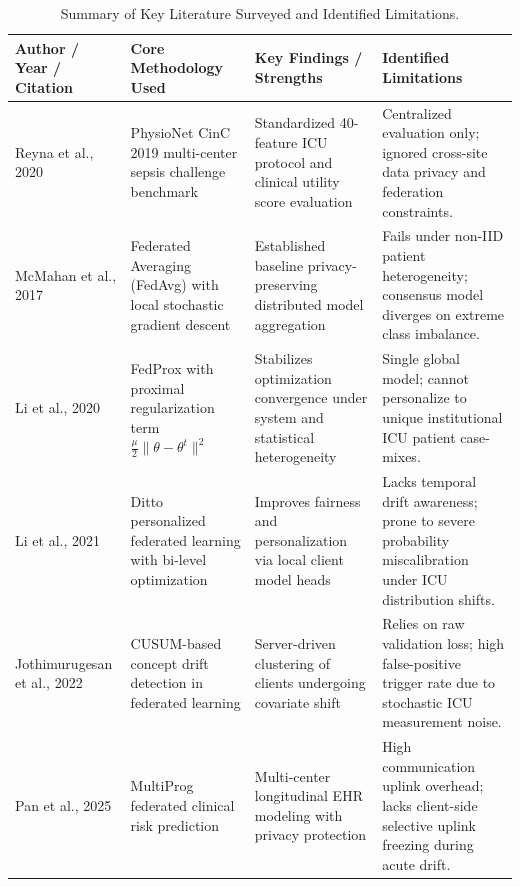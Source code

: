 \documentclass[11pt, a4paper]{article}
\begin{document}
\begin{table}[!htbp]
    \centering
    \footnotesize
    \renewcommand{\arraystretch}{1.12}
    \begin{tabular}{p{3.2cm} p{4.0cm} p{4.3cm} p{3.5cm}}
        \toprule
        \textbf{Author / Year / Citation} & \textbf{Core Methodology Used} & \textbf{Key Findings / Strengths} & \textbf{Identified Limitations} \\
        \midrule
        Reyna et al., 2020 \cite{reyna2019physionet} & PhysioNet CinC 2019 multi-center sepsis challenge benchmark & Standardized 40-feature ICU protocol and clinical utility score evaluation & Centralized evaluation only; ignored cross-site data privacy and federation constraints. \\
        \addlinespace[3pt]
        McMahan et al., 2017 \cite{mcmahan2017fedavg} & Federated Averaging (FedAvg) with local stochastic gradient descent & Established baseline privacy-preserving distributed model aggregation & Fails under non-IID patient heterogeneity; consensus model diverges on extreme class imbalance. \\
        \addlinespace[3pt]
        Li et al., 2020 \cite{li2020fedprox} & FedProx with proximal regularization term $\frac{\mu}{2}\|\theta - \theta^t\|^2$ & Stabilizes optimization convergence under system and statistical heterogeneity & Single global model; cannot personalize to unique institutional ICU patient case-mixes. \\
        \addlinespace[3pt]
        Li et al., 2021 \cite{li2021ditto} & Ditto personalized federated learning with bi-level optimization & Improves fairness and personalization via local client model heads & Lacks temporal drift awareness; prone to severe probability miscalibration under ICU distribution shifts. \\
        \addlinespace[3pt]
        Jothimurugesan et al., 2022 \cite{jothimurugesan2022drift} & CUSUM-based concept drift detection in federated learning & Server-driven clustering of clients undergoing covariate shift & Relies on raw validation loss; high false-positive trigger rate due to stochastic ICU measurement noise. \\
        \addlinespace[3pt]
        Pan et al., 2025 \cite{pan2025multiprog} & MultiProg federated clinical risk prediction & Multi-center longitudinal EHR modeling with privacy protection & High communication uplink overhead; lacks client-side selective uplink freezing during acute drift. \\
        \bottomrule
    \end{tabular}
    \caption{Summary of Key Literature Surveyed and Identified Limitations.}
    \label{tab:literature}
\end{table}
\end{document}
